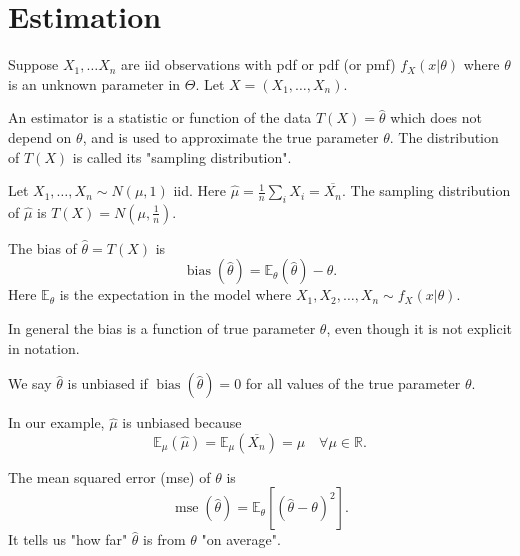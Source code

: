 \documentclass[egregdoesnotlikesansseriftitles,a4paper]{scrartcl}
\begin{document}
\section{Estimation}
Suppose $X_1 , \ldots X_n$ are iid observations with pdf or pdf (or pmf) $f_{X}(x| \theta)$ where $\theta$ is an unknown parameter in $\Theta$. Let $X=(X_1 , \ldots , X_{n})$. 
\begin{definition*}[Estimator]
     An estimator is a statistic or function of the data $T (X)=\hat{\theta}$ which does not depend on $\theta$, and is used to approximate the true parameter $\theta$. The distribution of $T (X)$ is called its "sampling distribution". 
\end{definition*}
\begin{example*}
     Let $X_1 , \ldots ,X_{n} \sim N (\mu,1)$ iid. Here $\hat{\mu}=\frac{1}{n}\sum_{i}^{}X_{i}=\overline{X_{n}}$. The sampling distribution of $\hat{\mu} $ is $T (X)=N (\mu, \frac{1}{n})$.   
\end{example*}
\begin{definition*}[Bias]
     The bias of $\hat{\theta}=T (X)$ is \[
     \operatorname{bias}(\hat{\theta})=\mathbb{E}_{\theta} (\hat{\theta})-\theta
     .\] Here $\mathbb{E}_{\theta}$ is the expectation in the model where $X_1 , X_2 , \ldots ,X_n \sim f_{X}(x|\theta)$.
\end{definition*}
\begin{remark}
     In general the bias is a function of true parameter $\theta$, even though it is not explicit in notation.  
\end{remark}
\begin{definition*}
     We say $\hat{\theta}$ is unbiased if $\operatorname{bias}(\hat{\theta})=0$ for all values of the true parameter $\theta$. 
\end{definition*}
In our example, $\hat{\mu}$ is unbiased because \[
\mathbb{E}_{\mu}(\hat{\mu})=\mathbb{E}_{\mu}(\overline{X_{n}})=\mu \quad \forall \mu \in \mathbb{R}
.\]  
\begin{definition*}
     The mean squared error (mse) of $\theta$ is \[
     \operatorname{mse}(\hat{\theta})=\mathbb{E}_{\theta} \left[ (\hat{\theta}-\theta)^2\right]
     .\] 
     It tells us "how far" $\hat{\theta}$ is from $\theta$ "on average".
\end{definition*}
\end{document}
